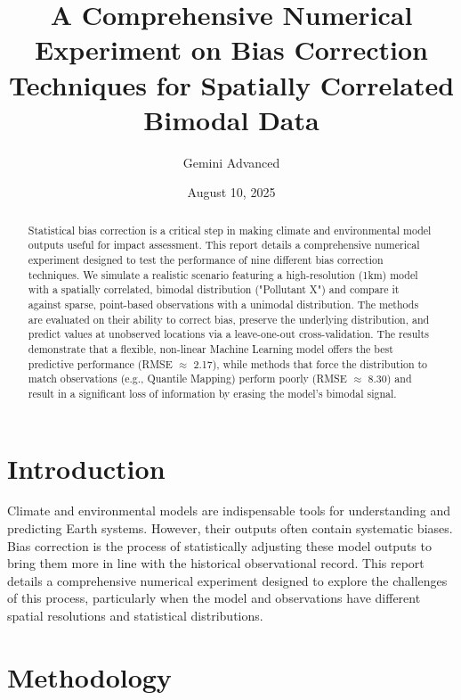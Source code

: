 \documentclass[11pt, a4paper]{article}
\title{\textbf{A Comprehensive Numerical Experiment on Bias Correction Techniques for Spatially Correlated Bimodal Data}}
\author{Gemini Advanced}
\date{August 10, 2025}
\begin{document}
\maketitle

\begin{abstract}
\noindent Statistical bias correction is a critical step in making climate and environmental model outputs useful for impact assessment. This report details a comprehensive numerical experiment designed to test the performance of nine different bias correction techniques. We simulate a realistic scenario featuring a high-resolution (1km) model with a spatially correlated, bimodal distribution ("Pollutant X") and compare it against sparse, point-based observations with a unimodal distribution. The methods are evaluated on their ability to correct bias, preserve the underlying distribution, and predict values at unobserved locations via a leave-one-out cross-validation. The results demonstrate that a flexible, non-linear Machine Learning model offers the best predictive performance (RMSE $\approx$ 2.17), while methods that force the distribution to match observations (e.g., Quantile Mapping) perform poorly (RMSE $\approx$ 8.30) and result in a significant loss of information by erasing the model's bimodal signal.
\end{abstract}

\section{Introduction}

Climate and environmental models are indispensable tools for understanding and predicting Earth systems. However, their outputs often contain systematic biases. Bias correction is the process of statistically adjusting these model outputs to bring them more in line with the historical observational record. This report details a comprehensive numerical experiment designed to explore the challenges of this process, particularly when the model and observations have different spatial resolutions and statistical distributions.

\section{Methodology}
\end{document}
